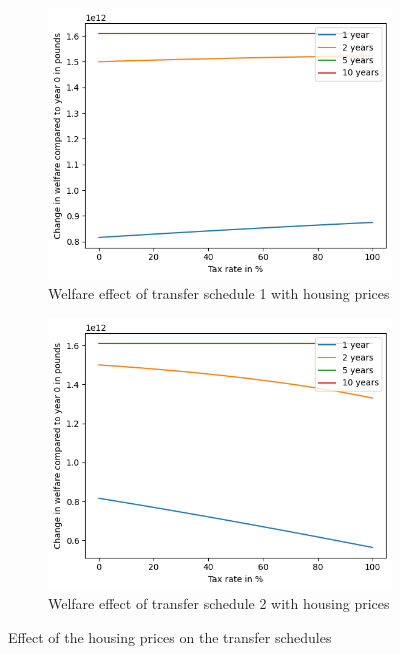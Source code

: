 \documentclass[10pt,a4paper]{article}
\begin{document}
\begin{figure}
\centering
\begin{subfigure}{.45\textwidth}
    \centering
    \includegraphics[width=\textwidth]{Report/schedule31.png}
    \caption{Welfare effect of transfer schedule 1 with housing prices}
\end{subfigure}
\begin{subfigure}{.45\textwidth}
    \centering
    \includegraphics[width=\textwidth]{Report/schedule32.png}
    \caption{Welfare effect of transfer schedule 2 with housing prices}
\end{subfigure}
\caption{Effect of the housing prices on the transfer schedules}
\label{fig:housing}
\end{figure}
\end{document}
